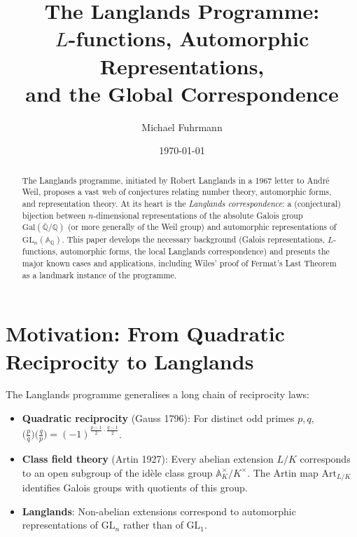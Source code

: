 \documentclass[12pt,a4paper]{amsart}
\theoremstyle{definition}
\newcommand{\Q}{\mathbb{Q}}
\newcommand{\GL}{\mathrm{GL}}
\newcommand{\GQ}{\mathrm{Gal}(\bar{\Q}/\Q)}
\newcommand{\Art}{\mathrm{Art}}
\begin{document}

\title{The Langlands Programme:\\
       $L$-functions, Automorphic Representations,\\
       and the Global Correspondence}

\author{Michael Fuhrmann}
\address{Specialist Mathematics Project, Build 120}
\date{\today}

\begin{abstract}
The Langlands programme, initiated by Robert Langlands in a 1967 letter to
André Weil, proposes a vast web of conjectures relating number theory,
automorphic forms, and representation theory.  At its heart is the
\emph{Langlands correspondence}: a (conjectural) bijection between
$n$-dimensional representations of the absolute Galois group
$\GQ$ (or more generally of the Weil group) and automorphic representations
of $\GL_n(\mathbb{A}_\Q)$.  This paper develops the necessary background
(Galois representations, $L$-functions, automorphic forms, the local
Langlands correspondence) and presents the major known cases and applications,
including Wiles' proof of Fermat's Last Theorem as a landmark instance of
the programme.
\end{abstract}

\maketitle
\tableofcontents

\section{Motivation: From Quadratic Reciprocity to Langlands}

The Langlands programme generalises a long chain of reciprocity laws:

\begin{itemize}
  \item \textbf{Quadratic reciprocity} (Gauss 1796): For distinct odd primes $p, q$,
    $\bigl(\frac{p}{q}\bigr)\bigl(\frac{q}{p}\bigr) = (-1)^{\frac{p-1}{2}\cdot\frac{q-1}{2}}$.
  \item \textbf{Class field theory} (Artin 1927): Every abelian extension $L/K$
    corresponds to an open subgroup of the idèle class group $\mathbb{A}_K^\times/K^\times$.
    The Artin map $\Art_{L/K}$ identifies Galois groups with quotients of this group.
  \item \textbf{Langlands}: Non-abelian extensions correspond to automorphic
    representations of $\GL_n$ rather than of $\GL_1$.
\end{itemize}
\end{document}
